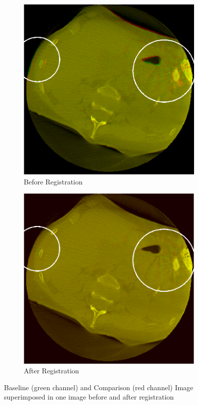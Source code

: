 \documentclass[]{spie}  %
\begin{document}
\begin{figure} 
\centering 
\begin{subfigure}[t]{0.45\textwidth} 
\includegraphics[width=\textwidth]{unregisteredSlice.png}
\caption{Before Registration} 
\label{unregSlice} 
\end{subfigure} 
\begin{subfigure}[t]{0.45\textwidth} 
\includegraphics[width=\textwidth]{registeredSlice.png} 
\caption{After Registration} \label{regSlice} 
\end{subfigure} 
\caption{Baseline (green channel) and Comparison (red channel) Image superimposed in one image before and after registration}
\label{beforeAndAfterReg} 

\end{figure}
\end{document}
